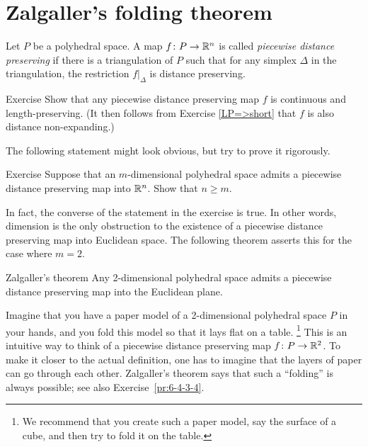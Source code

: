 \chapter{Zalgaller's folding theorem}

Let $P$ be a polyhedral space.
A map $f\colon P\to\mathbb{R}^n$ is called 
\emph{piecewise distance preserving}
if there is a triangulation of $P$ 
such that for any simplex $\Delta$ in the triangulation, 
the restriction $f|_\Delta$ is distance preserving.



\begin{thm}{Exercise}\label{ex:PDP=>cont}
Show that any piecewise distance preserving map $f$ is continuous and length-preserving.  
(It then follows from Exercise \ref{LP=>short} that $f$ is also distance non-expanding.)
\end{thm}


The following statement might look obvious, 
but try to prove it rigorously. 

\begin{thm}{Exercise}\label{ex:n=<m}
Suppose that an $m$-dimensional polyhedral space admits a piecewise distance preserving map into $\mathbb{R}^n$.
Show that $n\ge m$.
\end{thm}

In fact, the converse of the statement in the exercise is true.  In other words, dimension is the only obstruction to the existence of a piecewise distance preserving map into Euclidean space.
The following theorem asserts this for the case where $m=2$.

\begin{thm}{Zalgaller's theorem}\label{thm:zalgaller}
Any 2-dimensional polyhedral space admits a piecewise distance preserving map into the Euclidean plane.
\end{thm}

Imagine that you have a paper model of a 2-dimensional polyhedral space $P$ in your hands, and you fold this model so that it lays flat on a table.%
\footnote{We recommend that you create such a paper model, say the surface of a cube, and then try to fold it on the table.}
This is an intuitive way to think of a piecewise distance preserving map $f\colon P \to \mathbb{R}^2$.
To make it closer to the actual definition, one has to imagine that the layers of paper can go through each other.
Zalgaller's theorem says that such a ``folding'' is always possible;
see also Exercise~\ref{pr:6-4-3-4}.
  

